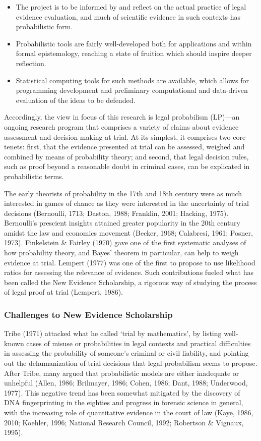 \documentclass[11pt,dvipsnames,enabledeprecatedfontcommands]{scrartcl}
\begin{document}
\begin{itemize}
\item
  The project is to be informed by and reflect on the actual practice of
  legal evidence evaluation, and much of scientific evidence in such
  contexts has probabilistic form.
\item
  Probabilistic tools are fairly well-developed both for applications
  and within formal epistemology, reaching a state of fruition which
  should inspire deeper reflection.
\item
  Statistical computing tools for such methods are available, which
  allows for programming development and preliminary computational and
  data-driven evaluation of the ideas to be defended.
\end{itemize}

Accordingly, the view in focus of this research is legal probabilism
(LP)---an ongoing research program that comprises a variety of claims
about evidence assessment and decision-making at trial. At its simplest,
it comprises two core tenets: first, that the evidence presented at
trial can be assessed, weighed and combined by means of probability
theory; and second, that legal decision rules, such as proof beyond a
reasonable doubt in criminal cases, can be explicated in probabilistic
terms.

The early theorists of probability in the 17th and 18th century were as
much interested in games of chance as they were interested in the
uncertainty of trial decisions (Bernoulli, 1713; Daston, 1988; Franklin,
2001; Hacking, 1975). Bernoulli's prescient insights attained greater
popularity in the 20th century amidst the law and economics movement
(Becker, 1968; Calabresi, 1961; Posner, 1973). Finkelstein \& Fairley
(1970) gave one of the first systematic analyses of how probability
theory, and Bayes' theorem in particular, can help to weigh evidence at
trial. Lempert (1977) was one of the first to propose to use likelihood
ratios for assessing the relevance of evidence. Such contributions
fueled what has been called the New Evidence Scholarship, a rigorous way
of studying the process of legal proof at trial (Lempert, 1986).

\subsubsection{Challenges to New Evidence
Scholarship}\label{challenges-to-new-evidence-scholarship}

Tribe (1971) attacked what he called `trial by mathematics', by listing
well-known cases of misuse or probabilities in legal contexts and
practical difficulties in assessing the probability of someone's
criminal or civil liability, and pointing out the dehumanization of
trial decisions that legal probabilism seems to propose. After Tribe,
many argued that probabilistic models are either inadequate or unhelpful
(Allen, 1986; Brilmayer, 1986; Cohen, 1986; Dant, 1988; Underwood,
1977). This negative trend has been somewhat mitigated by the discovery
of DNA fingerprinting in the eighties and progress in forensic science
in general, with the increasing role of quantitative evidence in the
court of law (Kaye, 1986, 2010; Koehler, 1996; National Research
Council, 1992; Robertson \& Vignaux, 1995).
\end{document}
